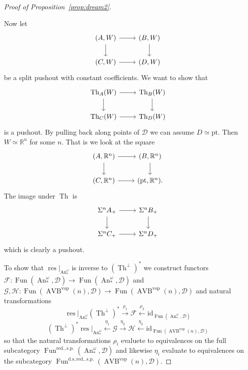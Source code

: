 \documentclass{article}
\newcommand{\xto}{\xrightarrow}
\newcommand{\xot}{\xleftarrow}
\newcommand{\R}{\mathbb{R}} %
\newcommand{\cD}{\mathcal{D}}
\newcommand{\pt}{\mathrm{pt}}
\newcommand{\vop}{\mathrm{vop}}
\newcommand{\id}{\mathrm{id}}
\DeclareMathOperator{\AVB}{AVB}
\DeclareMathOperator{\An}{An}
\DeclareMathOperator{\Fun}{Fun}
\DeclareMathOperator{\res}{res}
\DeclareMathOperator{\Th}{Th}
\begin{document}
\begin{proof}[Proof of Proposition~\ref{prop:dream2}]
\begin{itemize}
        Now let 
        \[\begin{tikzcd}
            {(A,W)} & {(B,W)} \\
            {(C,W)} & {(D,W)}
            \arrow[from=1-1, to=1-2]
            \arrow[from=2-1, to=2-2]
            \arrow[from=1-2, to=2-2]
            \arrow[from=1-1, to=2-1]
        \end{tikzcd}\]
        be a split pushout with constant coefficients. We want to show that 
        \[\begin{tikzcd}
            {\Th_A(W)} & {\Th_B(W)} \\
            {\Th_C(W)} & {\Th_D(W)}
            \arrow[from=1-1, to=1-2]
            \arrow[from=2-1, to=2-2]
            \arrow[from=1-2, to=2-2]
            \arrow[from=1-1, to=2-1]
        \end{tikzcd}\]
        is a pushout. By pulling back along points of $\cD$ we can assume $D \simeq \pt$. Then $W \simeq \R^n$ for some $n$.
        That is we look at the square 
        \[\begin{tikzcd}
            {(A,\R^n)} & {(B,\R^n)} \\
            {(C,\R^n)} & {(\pt,\R^n)}
            \arrow[from=1-1, to=1-2]
            \arrow[from=2-1, to=2-2]
            \arrow[from=1-2, to=2-2]
            \arrow[from=1-1, to=2-1].
        \end{tikzcd}\]
        The image under $\Th$ is 
        \[\begin{tikzcd}
            {\Sigma^n A_+} & {\Sigma^n B_+} \\
            {\Sigma^nC_+} & {\Sigma^nD_+}
            \arrow[from=1-1, to=1-2]
            \arrow[from=2-1, to=2-2]
            \arrow[from=1-2, to=2-2]
            \arrow[from=1-1, to=2-1]
        \end{tikzcd}\]
        which is clearly a pushout. 
    \end{itemize}

    To show that $\res|_{\An_*^\omega}$ is inverse to $(\Th^\perp)^*$ we construct functors $\mathcal F \colon \Fun(\An_*^\omega, \mathcal D) \to \Fun(\An_*^\omega, \mathcal D)$
    and $\mathcal G, \mathcal H \colon \Fun(\AVB^\vop(n), \mathcal D) \to \Fun(\AVB^\vop(n),\mathcal D)$ and natural transformations 
    \[
    \res|_{\An_*^\omega} (\Th^\perp)^* \xrightarrow{\rho_1} \mathcal F \xleftarrow{\rho_2}   \id_{\Fun(\An_*^\omega, \mathcal D)} 
    \]
    \[
        (\Th^\perp)^* \res|_{\An_*^\omega} \xleftarrow{\eta_1} \mathcal G \xto{\eta_2} \mathcal H \xot{\eta_3} \id_{\Fun(\AVB^\vop(n), \mathcal D)}   
    \]
    so that the natural transformations $\rho_i$ evaluete to equivalences on the full subcategory 
    $\Fun^{\mathrm{red.,s.p.}}(\An_*^\omega, \cD)$ and 
    likewise $\eta_i$ evaluate to equivalences on the subcategory 
    $\Fun^{\mathrm{d.s,red.,s.p.}}(\AVB^\vop(n), \mathcal D)$.


\end{proof}
\end{document}
